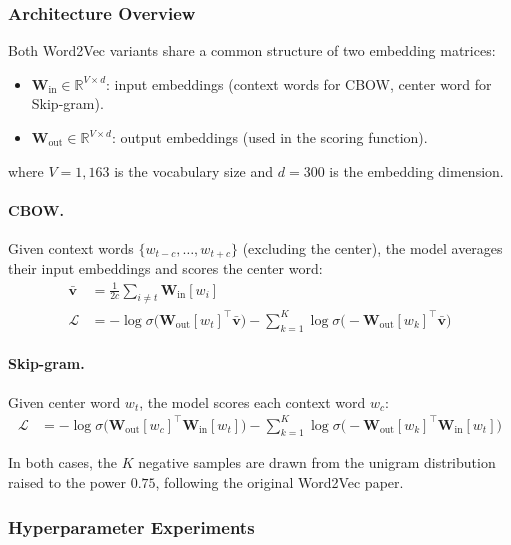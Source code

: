 \documentclass[12pt, a4paper]{article}
\begin{document}
\subsubsection{Architecture Overview}

Both Word2Vec variants share a common structure of two embedding matrices:

\begin{itemize}[nosep]
  \item $\mathbf{W}_{\mathrm{in}} \in \mathbb{R}^{V \times d}$: input embeddings (context words for CBOW, center word for Skip-gram).
  \item $\mathbf{W}_{\mathrm{out}} \in \mathbb{R}^{V \times d}$: output embeddings (used in the scoring function).
\end{itemize}

where $V = 1{,}163$ is the vocabulary size and $d = 300$ is the embedding dimension.

\paragraph{CBOW.} Given context words $\{w_{t-c}, \ldots, w_{t+c}\}$ (excluding the center), the model averages their input embeddings and scores the center word:
\begin{align}
  \bar{\mathbf{v}} &= \frac{1}{2c} \sum_{i \neq t} \mathbf{W}_{\mathrm{in}}[w_i] \\
  \mathcal{L} &= -\log\sigma\!\bigl(\mathbf{W}_{\mathrm{out}}[w_t]^\top \bar{\mathbf{v}}\bigr) - \sum_{k=1}^{K} \log\sigma\!\bigl(-\mathbf{W}_{\mathrm{out}}[w_k]^\top \bar{\mathbf{v}}\bigr)
\end{align}

\paragraph{Skip-gram.} Given center word $w_t$, the model scores each context word $w_c$:
\begin{align}
  \mathcal{L} &= -\log\sigma\!\bigl(\mathbf{W}_{\mathrm{out}}[w_c]^\top \mathbf{W}_{\mathrm{in}}[w_t]\bigr) - \sum_{k=1}^{K} \log\sigma\!\bigl(-\mathbf{W}_{\mathrm{out}}[w_k]^\top \mathbf{W}_{\mathrm{in}}[w_t]\bigr)
\end{align}

In both cases, the $K$ negative samples are drawn from the unigram distribution raised to the power $0.75$, following the original Word2Vec paper.

\subsubsection{Hyperparameter Experiments}
\end{document}

